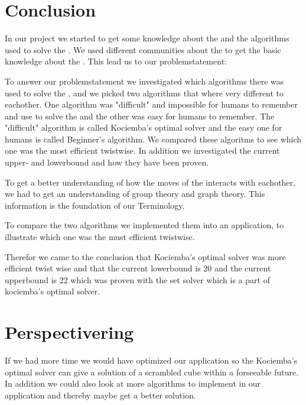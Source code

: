 \chapter{Conclusion}
In our project we started to get some knowledge about the \rubik{} and the algorithms used to solve the \rubik{}. We used different communities about the \rubik{} to get the basic knowledge about the \rubik{}. This lead us to our problemstatement:
%

To answer our problemstatement we investigated which algorithms there was used to solve the \rubik{}, and we picked two algorithms that where very different to eachother. One algorithm was "difficult" and impossible for humans to remember and use to solve the \rubik{} and the other was easy for humans to remember. The "difficult" algorithm is called Kociemba's optimal solver and the easy one for humans is called Beginner's algorithm. We compared these algoritms to see which one was the most efficient twistwise. In addition we investigated the current upper- and lowerbound and how they have been proven.

To get a better understanding of how the moves of the \rubik{} interacts with eachother, we had to get an understanding of group theory and graph theory. This information is the foundation of our Terminology.

To compare the two algorithms we implemented them into an application, to illustrate which one was the must efficient twistwise. 

Therefor we came to the conclusion that Kociemba's optimal solver was more efficient twist wise and that the current lowerbound is 20 and the current upperbound is 22 which was proven with the set solver which is a part of kociemba's optimal solver.

\chapter{Perspectivering}
If we had more time we would have optimized our application so the Kociemba's optimal solver can give a solution of a scrambled cube within a forseeable future. In addition we could also look at more algorithms to implement in our application and thereby maybe get a better solution.